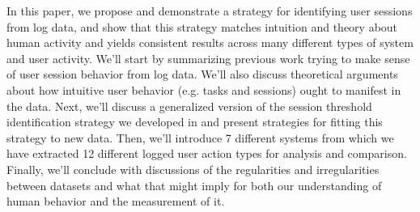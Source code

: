 In this paper, we propose and demonstrate a strategy for identifying user sessions from log data, and show that this strategy matches intuition and theory about human activity and yields consistent results across many different types of system and user activity.  We'll start by summarizing previous work trying to make sense of user session behavior from log data.  We'll also discuss theoretical arguments about how intuitive user behavior (e.g. tasks and sessions) ought to manifest in the data.  Next, we'll discuss a generalized version of the session threshold identification strategy we developed in \cite{geiger2013using} and present strategies for fitting this strategy to new data.  Then, we'll introduce 7 different systems from which we have extracted 12 different logged user action types for analysis and comparison. Finally, we'll conclude with discussions of the regularities and irregularities between datasets and what that might imply for both our understanding of human behavior and the measurement of it.
